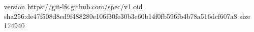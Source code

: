 version https://git-lfs.github.com/spec/v1
oid sha256:de47f508d8ed9f488280e106f30fe30b3e60b14f0fb596fb4b78a516dcf607a8
size 174940
